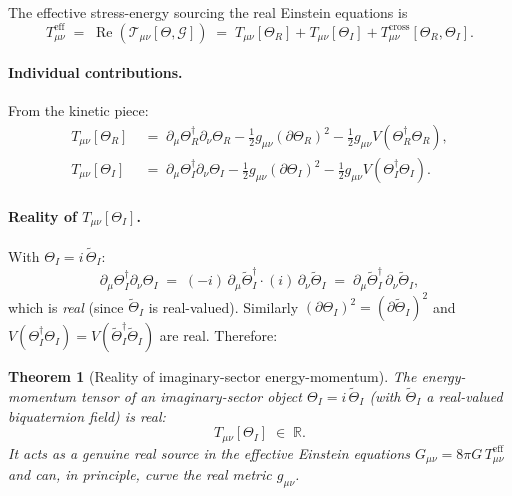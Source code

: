 \documentclass[12pt]{article}
\newtheorem{theorem}{Theorem}
\begin{document}
The effective stress-energy sourcing the real Einstein equations is
\begin{equation}
  T_{\mu\nu}^{\mathrm{eff}}
  \;=\; \operatorname{Re}\!\left(\mathcal{T}_{\mu\nu}[\Theta,\mathcal{G}]\right)
  \;=\; T_{\mu\nu}[\Theta_R]
       + T_{\mu\nu}[\Theta_I]
       + T_{\mu\nu}^{\mathrm{cross}}[\Theta_R,\Theta_I].
\end{equation}

\paragraph{Individual contributions.}
From the kinetic piece:
\begin{align}
  T_{\mu\nu}[\Theta_R]
  &\;=\; \partial_\mu\Theta_R^\dagger\partial_\nu\Theta_R
        - \tfrac{1}{2}g_{\mu\nu}(\partial\Theta_R)^2
        - \tfrac{1}{2}g_{\mu\nu}V(\Theta_R^\dagger\Theta_R),\\
  T_{\mu\nu}[\Theta_I]
  &\;=\; \partial_\mu\Theta_I^\dagger\partial_\nu\Theta_I
        - \tfrac{1}{2}g_{\mu\nu}(\partial\Theta_I)^2
        - \tfrac{1}{2}g_{\mu\nu}V(\Theta_I^\dagger\Theta_I).
\end{align}

\paragraph{Reality of $T_{\mu\nu}[\Theta_I]$.}
With $\Theta_I = i\,\widetilde\Theta_I$:
\begin{equation}
  \partial_\mu\Theta_I^\dagger\partial_\nu\Theta_I
  \;=\; (-i)\,\partial_\mu\widetilde\Theta_I^\dagger
        \cdot (i)\,\partial_\nu\widetilde\Theta_I
  \;=\; \partial_\mu\widetilde\Theta_I^\dagger\,\partial_\nu\widetilde\Theta_I,
\end{equation}
which is \emph{real} (since $\widetilde\Theta_I$ is real-valued).
Similarly $(\partial\Theta_I)^2 = (\partial\widetilde\Theta_I)^2$
and $V(\Theta_I^\dagger\Theta_I) = V(\widetilde\Theta_I^\dagger\widetilde\Theta_I)$
are real.  Therefore:

\begin{theorem}[Reality of imaginary-sector energy-momentum]
\label{thm:tmunu_real}
The energy-momentum tensor of an imaginary-sector object
$\Theta_I = i\,\widetilde\Theta_I$ (with $\widetilde\Theta_I$
a real-valued biquaternion field) is \emph{real}:
\begin{equation}
  T_{\mu\nu}[\Theta_I] \;\in\; \mathbb{R}.
\end{equation}
It acts as a genuine real source in the effective Einstein equations
$G_{\mu\nu} = 8\pi G\,T_{\mu\nu}^{\mathrm{eff}}$ and can, in
principle, curve the real metric $g_{\mu\nu}$.
\end{theorem}
\end{document}
